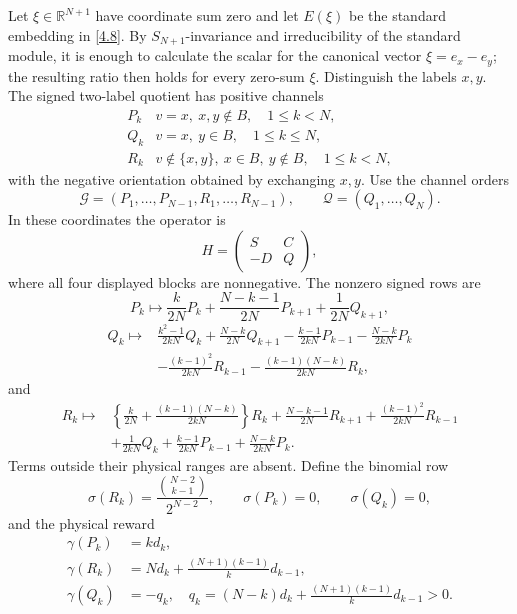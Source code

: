 Let $\xi\in\mathbb R^{N+1}$ have coordinate sum zero and let $E(\xi)$ be
the standard embedding in \eqref{4.8}.  By $S_{N+1}$-invariance and
irreducibility of the standard module, it is enough to calculate the scalar
for the canonical vector $\xi=e_x-e_y$; the resulting ratio then holds for
every zero-sum $\xi$.  Distinguish the labels $x,y$.  The
signed two-label quotient has positive channels
\[
\begin{array}{c|l}
P_k&v=x,\ x,y\notin B,\quad 1\le k<N,\\
Q_k&v=x,\ y\in B,\quad 1\le k\le N,\\
R_k&v\notin\{x,y\},\ x\in B,\ y\notin B,\quad 1\le k<N,
\end{array}
\]
with the negative orientation obtained by exchanging $x,y$.  Use the channel
orders
\[
 \mathcal G=(P_1,\ldots,P_{N-1},R_1,\ldots,R_{N-1}),
 \qquad \mathcal Q=(Q_1,\ldots,Q_N).
\]
In these coordinates the operator is
\[
 H=\begin{pmatrix}S&C\\-D&Q\end{pmatrix},                 \tag{A.4s}\label{A.4s}
\]
where all four displayed blocks are nonnegative.  The nonzero signed rows
are
\[
 P_k\mapsto {\frac{k}{2N}}P_k+{\frac{N-k-1}{2N}}P_{k+1}
                   +{\frac{1}{2N}}Q_{k+1},                    \tag{A.5s}\label{A.5s}
\]
\[
\begin{aligned}
 Q_k\mapsto{}&{\frac{k^2-1}{2kN}}Q_k+{\frac{N-k}{2N}}Q_{k+1}
 -{\frac{k-1}{2kN}}P_{k-1}-{\frac{N-k}{2kN}}P_k\\
 &-{\frac{(k-1)^2}{2kN}}R_{k-1}
 -{\frac{(k-1)(N-k)}{2kN}}R_k,
\end{aligned}                                               \tag{A.6s}\label{A.6s}
\]
and
\[
\begin{aligned}
 R_k\mapsto{}&\left\{{\frac{k}{2N}}+{\frac{(k-1)(N-k)}{2kN}}\right\}R_k
 +{\frac{N-k-1}{2N}}R_{k+1}+{\frac{(k-1)^2}{2kN}}R_{k-1}\\
 &+{\frac{1}{2kN}}Q_k+{\frac{k-1}{2kN}}P_{k-1}
 +{\frac{N-k}{2kN}}P_k .
\end{aligned}                                               \tag{A.7s}\label{A.7s}
\]
Terms outside their physical ranges are absent.  Define the binomial row
\[
 \sigma(R_k)={\frac{\binom{N-2}{k-1}}{2^{N-2}}},\qquad
 \sigma(P_k)=0,\qquad \sigma(Q_k)=0,                       \tag{A.8s}\label{A.8s}
\]
and the physical reward
\[
\begin{aligned}
 \gamma(P_k)&=k d_k,\\
 \gamma(R_k)&=N d_k+{\frac{(N+1)(k-1)}{ k}}d_{k-1},\\
 \gamma(Q_k)&=-q_k,
 \quad q_k=(N-k)d_k+{\frac{(N+1)(k-1)}{ k}}d_{k-1}>0.
\end{aligned}                                               \tag{A.9s}\label{A.9s}
\]
